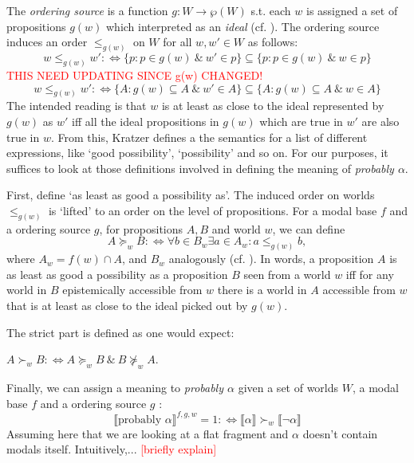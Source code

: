 \documentclass{article}
\theoremstyle{definition}
\newcommand\todo[1]{\textcolor{red}{#1}}
\newcommand{\lb}{\llbracket}
\newcommand{\rb}{\rrbracket}
\begin{document}
The \emph{ordering source} is a function $g: W \rightarrow \wp(W)$ s.t. each $w$ is assigned a set of propositions $g(w)$ which interpreted as an \emph{ideal} (cf. \cite{lewis81_order_seman_premis_seman_count}). The ordering source induces an order $\leq_{g(w)}$ on $W$ for all $w,w' \in W$ as follows:
\begin{equation}
    \label{eq:porder}
w \leq_{g(w)} w' :\iff \{p: p\in g(w) ~\&~ w' \in p\} \subseteq \{p: p\in  g(w) ~\&~ w \in p\}
\end{equation}
\todo{THIS NEED UPDATING SINCE g(w) CHANGED!}
\begin{equation}
    \label{eq:porder}
w \leq_{g(w)} w' :\iff \{A: g(w) \subseteq A ~\&~ w' \in A\} \subseteq \{A: g(w) \subseteq A ~\&~ w \in A\}
\end{equation}
The intended reading is that $w$ is at least as close to the ideal represented by $g(w)$ as $w'$ iff all the ideal propositions in $g(w)$ which are true in $w'$ are also true in $w$.
From this, Kratzer defines a the semantics for a list of different expressions, like `good possibility', `possibility' and so on.
For our purposes, it suffices to look at those definitions involved in defining the meaning of \emph{probably $\alpha$}.

First, define `as least as good a possibility as'.
The induced order on worlds $\leq_{g(w)}$ is `lifted' to an order on the level of propositions.
For a modal base $f$ and a ordering source $g$, for propositions $A,B$ and world $w$, we can define
\begin{equation}
    \label{eq:lifted}
    A \succeq_w B :\iff \forall b \in B_w \exists a \in A_w: a \leq_{g(w)} b,
\end{equation}
where $A_w = f(w) \cap A$, and $B_w$ analogously (cf. \cite[][p.~519]{holliday13_measur}).
In words, a proposition $A$ is as least as good a possibility as a proposition $B$ seen from a world $w$ iff for any world in $B$ epistemically accessible from $w$ there is a world in $A$ accessible from $w$ that is at least as close to the ideal picked out by $g(w)$.

The strict part is defined as one would expect:

\noindent $A \succ_w B :\iff {A \succeq_w B ~\&~ B \not\succeq_w A}$.  

Finally, we can assign a meaning to \emph{probably $\alpha$} given a set of worlds $W$, a modal base $f$ and a ordering source $g$ \parencite[][p.~645]{kratzer91_modal}:
\begin{equation}
\llbracket \text{probably } \alpha \rrbracket^{f,g,w} = 1 :\iff \lb \alpha \rb \succ_w \lb \neg\alpha \rb
\end{equation}
Assuming here that we are looking at a flat fragment and $\alpha$ doesn't contain modals itself.
Intuitively,... \todo{[briefly explain]}
\end{document}
